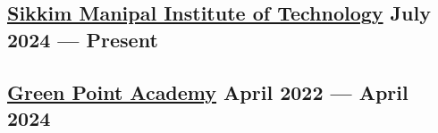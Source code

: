 





\subsection{{\href{https://smu.edu.in/smit/}{Sikkim Manipal Institute of Technology} \hfill July 2024 --- Present}}

\vspace{0.25em}
\vspace{0.2em}
\begin{null}
\end{null}

\subsection{{\href{https://www.greenpointacademy.org/}{Green Point Academy} \hfill April 2022 --- April 2024}}
\begin{null}

\end{null}


